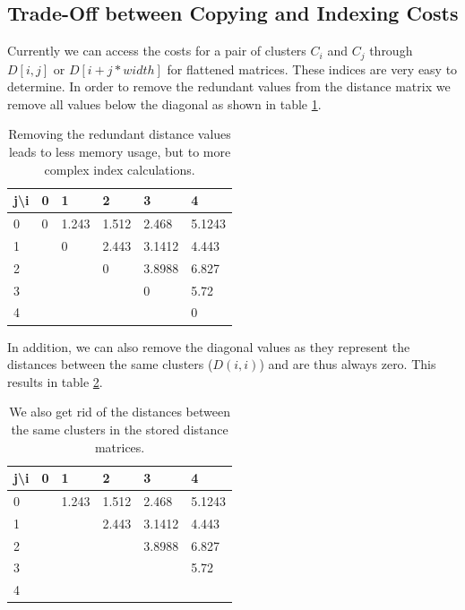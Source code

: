 \subsection{Trade-Off between Copying and Indexing Costs}

Currently we can access the costs for a pair of clusters $C_i$ and $C_j$ through $D[i,j]$ or $D[i + j * width]$ for flattened matrices. These indices are very easy to determine. In order to remove the redundant values from the distance matrix we remove all values below the diagonal as shown in table \ref{dp:distances2}.

\begin{table}[h]
    \centering
    \begin{tabular}{|l | l l l l l|}
    \hline
    j\textbackslash i & 0 & 1 & 2 & 3 & 4\\ \hline
    0 & 0 & 1.243 & 1.512 & 2.468 & 5.1243\\
    1 & \cellcolor{gray!25} & 0 & 2.443 & 3.1412 & 4.443\\
    2 & \cellcolor{gray!25} & \cellcolor{gray!25} & 0 & 3.8988 & 6.827\\
    3 & \cellcolor{gray!25} & \cellcolor{gray!25} & \cellcolor{gray!25} & 0 & 5.72\\
    4 & \cellcolor{gray!25} & \cellcolor{gray!25} & \cellcolor{gray!25} & \cellcolor{gray!25} & 0\\ \hline
    \end{tabular}
    \caption{Removing the redundant distance values leads to less memory usage, but to more complex index calculations.}
    \label{dp:distances2}
\end{table}

In addition, we can also remove the diagonal values as they represent the distances between the same clusters ($D(i,i)$) and are thus always zero. This results in table \ref{dp:distances3}.

\begin{table}[H]
    \centering
    \begin{tabular}{|l | l l l l l|}
    \hline
    j\textbackslash i & 0 & 1 & 2 & 3 & 4\\ \hline
    0 & \cellcolor{gray!25} & 1.243 & 1.512 & 2.468 & 5.1243\\
    1 & \cellcolor{gray!25} & \cellcolor{gray!25} & 2.443 & 3.1412 & 4.443\\
    2 & \cellcolor{gray!25} & \cellcolor{gray!25} & \cellcolor{gray!25} & 3.8988 & 6.827\\
    3 & \cellcolor{gray!25} & \cellcolor{gray!25} & \cellcolor{gray!25} & \cellcolor{gray!25} & 5.72\\
    4 & \cellcolor{gray!25} & \cellcolor{gray!25} & \cellcolor{gray!25} & \cellcolor{gray!25} & \cellcolor{gray!25} \\ \hline
    \end{tabular}
    \caption{We also get rid of the distances between the same clusters in the stored distance matrices.}
    \label{dp:distances3}
\end{table}


